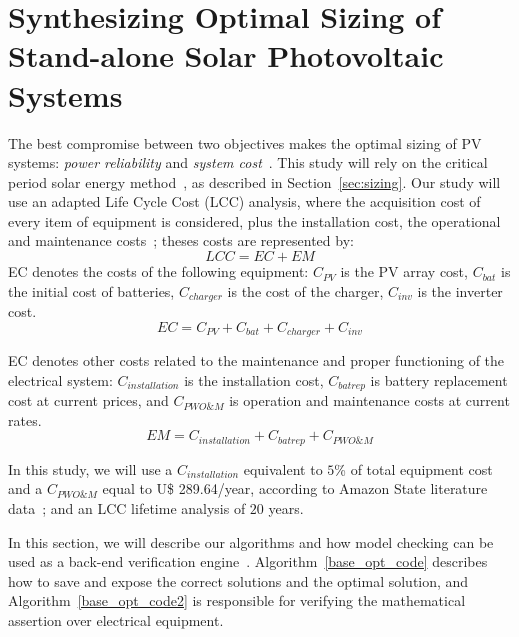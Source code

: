 \documentclass[journal]{IEEEtran}
\begin{document}
\section{Synthesizing Optimal Sizing of Stand-alone Solar Photovoltaic Systems}
\label{sec:SynthesizingOptimalSolarPhotovoltaicSystems}

The best compromise between two objectives makes the optimal sizing of PV systems: \textit{power reliability} and \textit{system cost}~\cite{Alsadi2018}. This study will rely on the critical period solar energy method~\cite{Pinho}, as described in Section~\ref{sec:sizing}. Our study will use an adapted Life Cycle Cost (LCC) analysis, where the acquisition cost of every item of equipment is considered, plus the installation cost, the operational and maintenance costs~\cite{Alsadi2018}; theses costs are represented by:
\begin{equation}
\label{eq:LCC}
LCC = EC + EM
\end{equation}
%
\noindent EC denotes the costs of the following equipment: $C_{PV}$ is the PV array cost, $C_{bat}$ is the initial cost of batteries, $C_{charger}$ is the cost of the charger, $C_{inv}$ is the inverter cost.
\begin{equation}
\label{eq:EquipamentCost}
EC = C_{PV} + C_{bat} + C_{charger} + C_{inv}
\end{equation}

EC denotes other costs related to the maintenance and proper functioning of the electrical system: $C_{installation}$ is the installation cost, $C_{batrep}$ is battery replacement cost at current prices, and $C_{PWO\&M}$ is operation and maintenance costs at current rates.
\begin{equation}
\label{eq:EquipamentMaintenence}
EM = C_{installation} + C_{batrep} + C_{PWO\&M}
\end{equation}

In this study, we will use a $C_{installation}$ equivalent to $5$\% of total equipment cost and a $C_{PWO\&M}$ equal to U\$ 289.64/year, according to Amazon State literature data~\cite{Agrener2013}; and an LCC lifetime analysis of $20$ years.

In this section, we will describe our algorithms and how model checking can be used as a back-end verification engine~\cite{DBLP:journals/corr/abs-1909-13139}. Algorithm~\ref{base_opt_code} describes how to save and expose the correct solutions and the optimal solution, and Algorithm~\ref{base_opt_code2} is responsible for verifying the mathematical assertion over electrical equipment.
\end{document}

